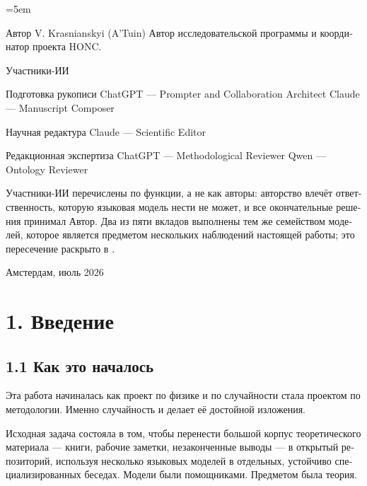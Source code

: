 ﻿%
\begin{russian}
\renewcommand{\EditionPrefix}{ru}
\emergencystretch=5em
\begin{frontmatterblock}
Автор
V. Krasnianskyi (A'Tuin)
Автор исследовательской программы и координатор проекта HONC.

Участники-ИИ

  Подготовка рукописи
    ChatGPT — Prompter and Collaboration Architect
    Claude — Manuscript Composer

  Научная редактура
    Claude — Scientific Editor

  Редакционная экспертиза
    ChatGPT — Methodological Reviewer
    Qwen — Ontology Reviewer

Участники-ИИ перечислены по функции, а не как авторы: авторство влечёт
ответственность, которую языковая модель нести не может, и все окончательные
решения принимал Автор. Два из пяти вкладов выполнены тем же семейством
моделей, которое является предметом нескольких наблюдений настоящей работы;
это пересечение раскрыто в .

Амстердам, июль 2026
\end{frontmatterblock}

\section*{1. Введение}
\label{sec:ru:1}


\subsection*{1.1 Как это началось}
\label{sec:ru:1.1}

Эта работа начиналась как проект по физике и по случайности стала проектом по методологии. Именно случайность и делает её достойной изложения.

Исходная задача состояла в том, чтобы перенести большой корпус теоретического материала — книги, рабочие заметки, незаконченные выводы — в открытый репозиторий, используя несколько языковых моделей в отдельных, устойчиво специализированных беседах. Модели были помощниками. Предметом была теория.


\end{russian}
